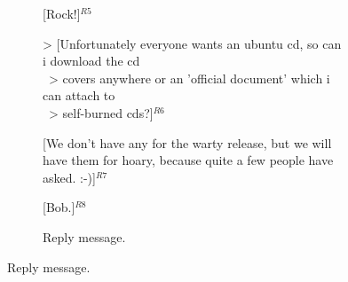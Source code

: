 \begin{figure}
\begin{minipage}{.63\textwidth}
{{\begin{subfigure}[b]{0.9\textwidth}
[Rock!]$^{R5}$\vspace{0.1cm}

> [Unfortunately everyone wants an ubuntu cd, so can i download the cd\\ \ 
> covers anywhere or an 'official document' which i can attach to\\ \ 
> self-burned cds?]$^{R6}$\vspace{0.1cm}

[We don't have any for the warty release, but we will have them for hoary, %
because quite a few people have asked. :-)]$^{R7}$\vspace{0.1cm}

[Bob.]$^{R8}$ %
                \caption{Reply message.}
                \label{fig:exampleReply}
        \end{subfigure}
}}

\end{minipage}
\end{figure}
